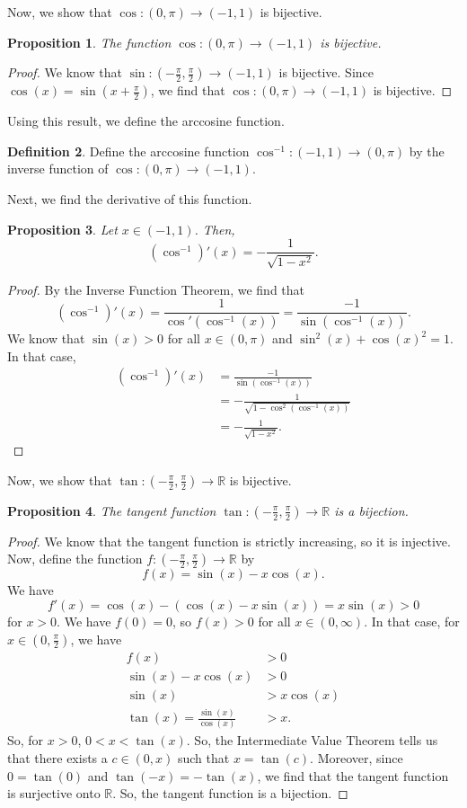 \documentclass[a4paper, openany]{memoir}
\theoremstyle{definition}
\newtheorem{definition}{Definition}[section]
\theoremstyle{plain}
\newtheorem{proposition}[definition]{Proposition}
\begin{document}
\noindent Now, we show that $\cos: (0, \pi) \to (-1, 1)$ is bijective.
\begin{proposition}
The function $\cos: (0, \pi) \to (-1, 1)$ is bijective.
\end{proposition}
\begin{proof}
We know that $\sin: (-\frac{\pi}{2}, \frac{\pi}{2}) \to (-1, 1)$ is bijective. Since $\cos (x) = \sin(x + \frac{\pi}{2})$, we find that $\cos: (0, \pi) \to (-1, 1)$ is bijective.
\end{proof}
\noindent Using this result, we define the arccosine function.
\begin{definition}
Define the arccosine function $\cos^{-1}: (-1, 1) \to (0, \pi)$ by the inverse function of $\cos: (0, \pi) \to (-1, 1)$.
\end{definition}
\noindent Next, we find the derivative of this function.
\begin{proposition}
Let $x \in (-1, 1)$. Then,
\[(\cos^{-1})'(x) = -\frac{1}{\sqrt{1 - x^2}}.\]
\end{proposition}
\begin{proof}
By the Inverse Function Theorem, we find that
\[(\cos^{-1})'(x) = \frac{1}{\cos'(\cos^{-1}(x))} = \frac{-1}{\sin(\cos^{-1}(x))}.\]
We know that $\sin(x) > 0$ for all $x \in (0, \pi)$ and $\sin^2(x) + \cos(x)^2 = 1$. In that case,
\begin{align*}
    (\cos^{-1})'(x) &= \frac{-1}{\sin(\cos^{-1}(x))} \\
    &= -\frac{1}{\sqrt{1 - \cos^2(\cos^{-1}(x))}} \\
    &= -\frac{1}{\sqrt{1 - x^2}}.
\end{align*}
\end{proof}
\noindent Now, we show that $\tan: (-\frac{\pi}{2}, \frac{\pi}{2}) \to \mathbb{R}$ is bijective.
\begin{proposition}
The tangent function $\tan: (-\frac{\pi}{2}, \frac{\pi}{2}) \to \mathbb{R}$ is a bijection.
\end{proposition}
\begin{proof}
We know that the tangent function is strictly increasing, so it is injective. Now, define the function $f: (-\frac{\pi}{2}, \frac{\pi}{2}) \to \mathbb{R}$ by
\[f(x) = \sin (x) - x \cos(x).\]
We have
\[f'(x) = \cos (x) - (\cos (x) - x \sin (x)) = x \sin (x) > 0\]
for $x > 0$. We have $f(0) = 0$, so $f(x) > 0$ for all $x \in (0, \infty)$. In that case, for $x \in (0, \frac{\pi}{2})$, we have
\begin{align*}
    f(x) &> 0 \\
    \sin (x) - x\cos (x) &> 0 \\
    \sin (x) &> x \cos (x) \\
    \tan (x) = \frac{\sin (x)}{\cos (x)} &> x.
\end{align*}
So, for $x > 0$, $0 < x < \tan(x)$. So, the Intermediate Value Theorem tells us that there exists a $c \in (0, x)$ such that $x = \tan (c)$. Moreover, since $0 = \tan(0)$ and $\tan(-x) = -\tan(x)$, we find that the tangent function is surjective onto $\mathbb{R}$. So, the tangent function is a bijection.
\end{proof}
\end{document}
